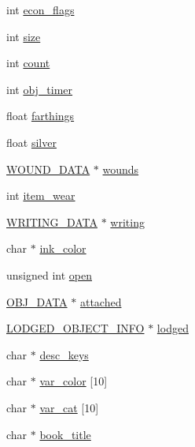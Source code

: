 \begin{DoxyCompactItemize}
int \hyperlink{structobj__data_a1d037ddb21556a101866d850c75d583b}{econ\-\_\-flags}
\item 
int \hyperlink{structobj__data_a2c647d90a0950b2d1a7df57312e0a8c9}{size}
\item 
int \hyperlink{structobj__data_aa3e2be840e3733d1b5a517aaf56a4a2a}{count}
\item 
int \hyperlink{structobj__data_a12a5ac819702187cb846edb50f2ed87b}{obj\-\_\-timer}
\item 
float \hyperlink{structobj__data_af4ff206e5e0202be4c5c961aa7e205d8}{farthings}
\item 
float \hyperlink{structobj__data_ae09016585c576af6f70f515cfa5955e7}{silver}
\item 
\hyperlink{structs_8h_acd99076446b10c8cfc2d23d4bfc40211}{W\-O\-U\-N\-D\-\_\-\-D\-A\-T\-A} $\ast$ \hyperlink{structobj__data_a2997f4de1379de9c729ca1db13d6a729}{wounds}
\item 
int \hyperlink{structobj__data_a132d2424c6bb01ffb09a5442c74ba14c}{item\-\_\-wear}
\item 
\hyperlink{structs_8h_aa211db6b081f782264d7abea0ab25025}{W\-R\-I\-T\-I\-N\-G\-\_\-\-D\-A\-T\-A} $\ast$ \hyperlink{structobj__data_ab0b14bb28260ae0f7ccbc29b500520b6}{writing}
\item 
char $\ast$ \hyperlink{structobj__data_a7762dc7230f9183a9a3fb097cae7c37f}{ink\-\_\-color}
\item 
unsigned int \hyperlink{structobj__data_aa4f93073a1bd334c269688ddf18847dd}{open}
\item 
\hyperlink{structs_8h_aaa59141dfc8c6ecdb6bfcf1537dd52d1}{O\-B\-J\-\_\-\-D\-A\-T\-A} $\ast$ \hyperlink{structobj__data_a834d9cc008c50fd20403d445369ed468}{attached}
\item 
\hyperlink{structs_8h_aa299ea0a69d123edbc3b581b10115e2b}{L\-O\-D\-G\-E\-D\-\_\-\-O\-B\-J\-E\-C\-T\-\_\-\-I\-N\-F\-O} $\ast$ \hyperlink{structobj__data_a10e523ad01f83e3078fa625ad07039c6}{lodged}
\item 
char $\ast$ \hyperlink{structobj__data_aa7817e64d68c66b38ba1dc0831bf0c71}{desc\-\_\-keys}
\item 
char $\ast$ \hyperlink{structobj__data_a0f8638bf5b66223b127e0a47255a46c4}{var\-\_\-color} \mbox{[}10\mbox{]}
\item 
char $\ast$ \hyperlink{structobj__data_af352f52f9de8c72bb528025f4d042489}{var\-\_\-cat} \mbox{[}10\mbox{]}
\item 
char $\ast$ \hyperlink{structobj__data_a4e5beb47c4a93b6ba2dfb9c3c3e861ca}{book\-\_\-title}
\item 

\end{DoxyCompactItemize}
